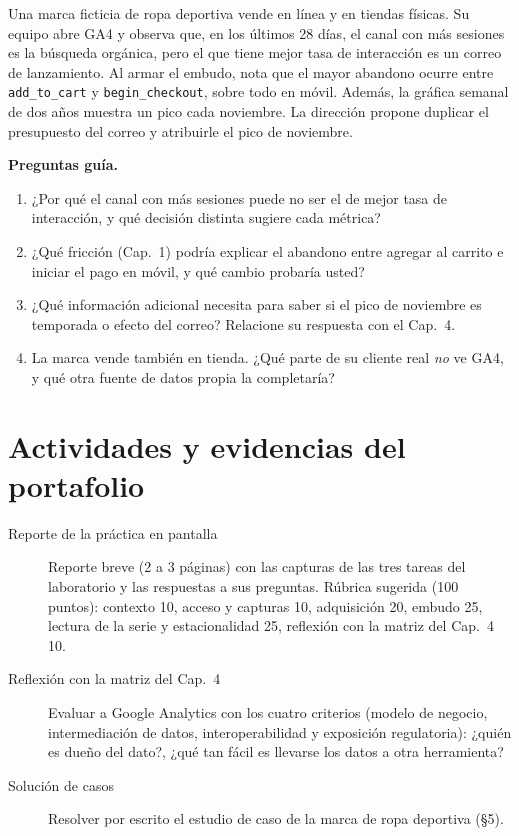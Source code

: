 \begin{casoFicticio}
Una marca ficticia de ropa deportiva vende en línea y en tiendas físicas. Su
equipo abre GA4 y observa que, en los últimos 28 días, el canal con más
sesiones es la búsqueda orgánica, pero el que tiene mejor tasa de interacción
es un correo de lanzamiento. Al armar el embudo, nota que el mayor abandono
ocurre entre \texttt{add\_to\_cart} y \texttt{begin\_checkout}, sobre todo en
móvil. Además, la gráfica semanal de dos años muestra un pico cada noviembre.
La dirección propone duplicar el presupuesto del correo y atribuirle el pico
de noviembre.

\textbf{Preguntas guía.}
\begin{enumerate}
  \item ¿Por qué el canal con más sesiones puede no ser el de mejor tasa de
  interacción, y qué decisión distinta sugiere cada métrica?
  \item ¿Qué fricción (Cap.~1) podría explicar el abandono entre agregar al
  carrito e iniciar el pago en móvil, y qué cambio probaría usted?
  \item ¿Qué información adicional necesita para saber si el pico de
  noviembre es temporada o efecto del correo? Relacione su respuesta con el
  Cap.~4.
  \item La marca vende también en tienda. ¿Qué parte de su cliente real
  \emph{no} ve GA4, y qué otra fuente de datos propia la completaría?
\end{enumerate}
\end{casoFicticio}

\section{Actividades y evidencias del portafolio}

\begin{description}
  \item[Reporte de la práctica en pantalla] Reporte breve (2 a 3 páginas) con
  las capturas de las tres tareas del laboratorio y las respuestas a sus
  preguntas. Rúbrica sugerida (100 puntos): contexto 10, acceso y capturas 10,
  adquisición 20, embudo 25, lectura de la serie y estacionalidad 25,
  reflexión con la matriz del Cap.~4 10.
  \item[Reflexión con la matriz del Cap.~4] Evaluar a Google Analytics con los
  cuatro criterios (modelo de negocio, intermediación de datos,
  interoperabilidad y exposición regulatoria): ¿quién es dueño del dato?, ¿qué
  tan fácil es llevarse los datos a otra herramienta?
  \item[Solución de casos] Resolver por escrito el estudio de caso de la marca
  de ropa deportiva (§5).
\end{description}

